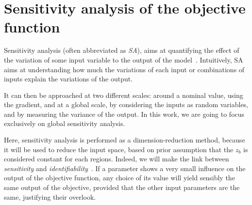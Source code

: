 \documentclass[../../Main_ManuscritThese.tex]{subfiles}
\newcommand{\zob}{z_b}
\begin{document}
\clearpage
\section{Sensitivity analysis of the objective function}
\label{sec:sensitivity-analysis}
Sensitivity analysis (often abbreviated as \emph{SA}), aims at
quantifying the effect of the variation of some input variable to the
output of the model~\citep{iooss_revue_2011,janon_analyse_2012}.
Intuitively, SA aims at understanding how much the variations
of each input or combinations of inputs explain the variations of the
output.

It can then be approached at two different scales:
around a nominal value, using the gradient, and at a global scale, by
considering the inputs as random variables, and by measuring the
variance of the output. In this work, we are going to focus
exclusively on global sensitivity analysis.

Here, sensitivity analysis is performed as a dimension-reduction
method, because it will be used to reduce the input space, based on
prior assumption that the $\zob$ is considered constant for
each regions. Indeed, we will make the link between \emph{sensitivity}
and \emph{identifiability}~\citep{dobre_global_2010}. %
If a parameter shows a very small influence on the output of the
objective function, any choice of its value will yield sensibly the
same output of the objective, provided that the other input parameters
are the same, justifying their overlook.


\end{document}
